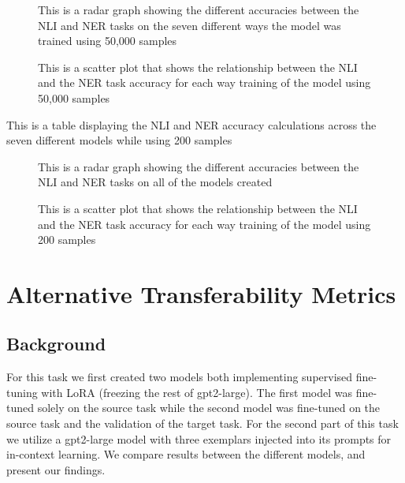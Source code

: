 \documentclass[10pt]{article}
\begin{document}
\begin{figure}
  \centering
  \caption{This is a radar graph showing the different accuracies between the NLI and NER tasks on the seven different ways the model was trained using 50,000 samples}
  \label{fig:3}
\end{figure}

\begin{figure}
  \centering
  \caption{This is a scatter plot that shows the relationship between the NLI and the NER task accuracy for each way training of the model using 50,000 samples}
  \label{fig:4}
\end{figure}

\begin{table}
  \centering
  \caption{This is a table displaying the NLI and NER accuracy calculations across the seven different models while using 200 samples}
  \label{table:red}
\end{table}

\begin{figure}
  \centering
  \caption{This is a radar graph showing the different accuracies between the NLI and NER tasks on all of the models created}
  \label{fig:5}
\end{figure}

\begin{figure}
  \centering
  \caption{This is a scatter plot that shows the relationship between the NLI and the NER task accuracy for each way training of the model using 200 samples}
  \label{fig:6}
\end{figure}
%
% 

\section{Alternative Transferability Metrics}

\subsection{Background}
For this task we first created two models both implementing supervised fine-tuning with LoRA 
(freezing the rest of gpt2-large). The first model was fine-tuned solely on the source task while the second model 
was fine-tuned on the source task and the validation of the target task. For the second part of this task we utilize 
a gpt2-large model with three exemplars injected into its prompts for in-context learning. We compare results between 
the different models, and present our findings.
\end{document}
